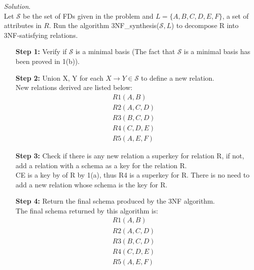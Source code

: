 \documentclass[10pt]{article}
\begin{document}
\begin{enumerate}
\begin{enumerate}
        \begin{mdframed}[leftmargin=-6.5mm]
        \textit{Solution}.\\
        Let $\mathcal{S}$ be the set of FDs given in the problem and $L = \{A,B,C,D,E,F\}$, a set of attributes in $R$. Run the algorithm 3NF\_synthesis($\mathcal{S}, L$) to decompose R into 3NF-satisfying relations.
        
        \begin{enumerate}[leftmargin=16mm]
            \item[\textbf{Step 1: }]Verify if $\mathcal{S}$ is a minimal basis (The fact that $\mathcal{S}$ is a minimal basis has been proved in 1(b)).
            \item[\textbf{Step 2: }]Union X, Y for each $X \rightarrow Y \in \mathcal{S}$ to define a new relation.\\
            New relations derived are listed below:
            \begin{gather*}
                R1(A, B)\\
                R2(A, C, D)\\
                R3(B, C, D)\\
                R4(C, D, E)\\
                R5(A, E, F)
            \end{gather*}
            
            \item[\textbf{Step 3: }]Check if there is any new relation a superkey for relation R, if not, add a relation with a schema as a key for the relation R. \\
            CE is a key by of R by 1(a), thus R4 is a superkey for R. There is no need to add a new relation whose schema is the key for R.
            \item[\textbf{Step 4: }]Return the final schema produced by the 3NF algorithm.\\
            The final schema returned by this algorithm is:
            \begin{gather*}
                R1(A, B)\\
                R2(A, C, D)\\
                R3(B, C, D)\\
                R4(C, D, E)\\
                R5(A, E, F)
            \end{gather*}
        \end{enumerate}
        \end{mdframed}
        

\end{enumerate}
\end{enumerate}
\end{document}

